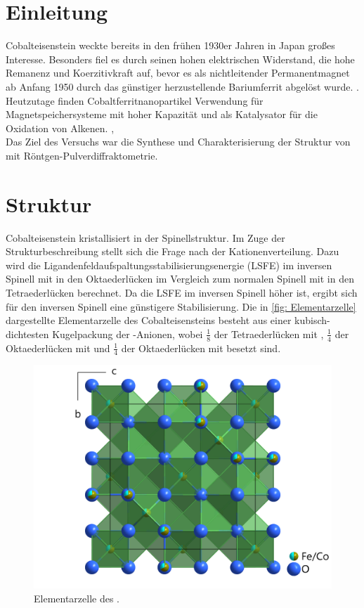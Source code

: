 \documentclass[a4paper,12pt,bibliography=totocnumbered]{scrartcl}
\begin{document}
\clearpage

\renewcommand{\thepage}{\arabic{page}}
\setcounter{page}{1}


\section{Einleitung}
Cobalteisenstein weckte bereits in den frühen 1930er Jahren in Japan großes Interesse. 
Besonders fiel es durch seinen hohen elektrischen Widerstand, die hohe Remanenz und Koerzitivkraft auf, bevor es als nichtleitender Permanentmagnet ab Anfang 1950 durch das günstiger herzustellende Bariumferrit abgelöst wurde.
\cite{History}.
Heutzutage finden Cobaltferritnanopartikel Verwendung für Magnetspeichersysteme mit hoher Kapazität und als Katalysator für die Oxidation von Alkenen. \cite{Rieck},\cite{Kat} \\
Das Ziel des Versuchs war die Synthese und Charakterisierung der Struktur von  mit Röntgen-Pulverdiffraktometrie.

\section{Struktur}
Cobalteisenstein kristallisiert in der Spinellstruktur. \cite{Rieck} 
Im Zuge der Strukturbeschreibung stellt sich die Frage nach der Kationenverteilung. 
Dazu wird die Ligandenfeldaufspaltungsstabilisierungsenergie (LSFE) im inversen Spinell mit  in den Oktaederlücken im Vergleich zum normalen Spinell mit  in den Tetraederlücken berechnet. 
Da die LSFE im inversen Spinell höher ist, ergibt sich für den inversen Spinell eine günstigere Stabilisierung.
Die in \autoref{fig: Elementarzelle} dargestellte Elementarzelle des Cobalteisensteins besteht aus einer kubisch-dichtesten Kugelpackung der -Anionen, wobei $\frac{1}{8}$ der Tetraederlücken mit , 
$\frac{1}{4}$ der Oktaederlücken mit  und $\frac{1}{4}$ der Oktaederlücken mit  besetzt sind. \\

\begin{figure}[H]
    \centering
    \includegraphics[width=0.75 \linewidth ]{Bilder/Elementarzelle.png}
    \caption{Elementarzelle des .\cite{Rieck}}
    \label{fig: Elementarzelle}
\end{figure}
\end{document}
